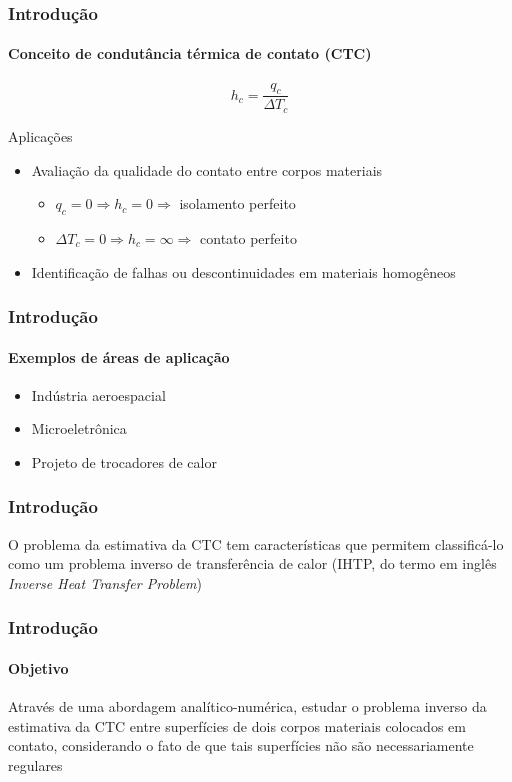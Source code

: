 \documentclass{beamer}
\begin{document}
\begin{frame}
	\frametitle{Introdução}
	\framesubtitle{Conceito de condutância térmica de contato (CTC)}
	
	\begin{definition}{}
		\begin{equation*}
			h_c = \frac{q_c}{\Delta T_c}
		\end{equation*}
	\end{definition}
	
	\begin{alertblock}{Aplicações}
		\begin{itemize}
			\item Avaliação da qualidade do contato entre corpos materiais
			\begin{itemize}
				\item $q_c = 0 \Rightarrow h_c = 0 \Rightarrow$ isolamento perfeito
				\item $\Delta T_c = 0 \Rightarrow h_c = \infty \Rightarrow$ contato perfeito
			\end{itemize}
			\item Identificação de falhas ou descontinuidades em materiais homogêneos			
		\end{itemize}
	\end{alertblock}
\end{frame}

\begin{frame}
	\frametitle{Introdução}
	\framesubtitle{Exemplos de áreas de aplicação}
	\begin{itemize}
		\item Indústria aeroespacial
		\item Microeletrônica
		\item Projeto de trocadores de calor
	\end{itemize}
\end{frame}

\begin{frame}
	\frametitle{Introdução}
	
	O problema da estimativa da CTC tem características que permitem classificá-lo como um problema inverso de transferência de calor (IHTP, do termo em inglês
	\textit{Inverse Heat Transfer Problem})
	
\end{frame}

\begin{frame}
	\frametitle{Introdução}
	\framesubtitle{Objetivo}
	\begin{alertblock}{}
		Através de uma abordagem analítico-numérica, estudar o problema inverso da estimativa da CTC entre superfícies
		de dois corpos materiais colocados em contato, considerando o fato de que tais superfícies não são necessariamente regulares
	\end{alertblock}
	\begin{center}
		
		
	\end{center}
\end{frame}
\end{document}
